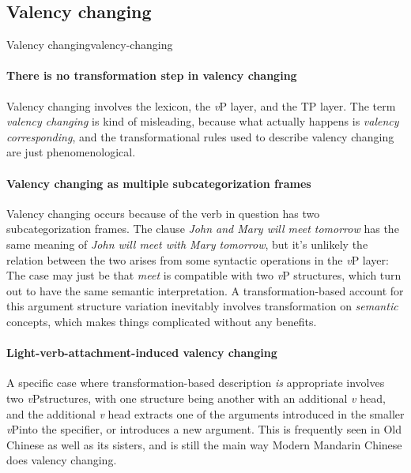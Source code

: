 \documentclass[UTF8, a4paper, oneside, scheme=plain]{ctexrep}
\newcommand*{\term}[1]{\emph{#1}}
\newcommand{\corpus}[1]{\emph{#1}}
\newcommand{\vP}{\textit{v}P}
\begin{document}
\subsection{Valency changing}\label{sec:overview.valency-changing}

\begin{theorybox}{Valency changing}{valency-changing}
    \paragraph*{There is no transformation step in valency changing} 
    Valency changing involves the lexicon, the \vP{} layer, and the TP layer.
    The term \term{valency changing} is kind of misleading,
    because what actually happens is \emph{valency corresponding},
    and the transformational rules used to describe valency changing 
    are just phenomenological.

    \paragraph*{Valency changing as multiple subcategorization frames} 
    Valency changing occurs because of 
    the verb in question has two subcategorization frames.
    The clause \corpus{John and Mary will meet tomorrow} 
    has the same meaning of \corpus{John will meet with Mary tomorrow},
    but it's unlikely the relation between the two arises from some syntactic operations in the \vP{} layer:
    The case may just be that \corpus{meet} is compatible with two \vP{} structures,
    which turn out to have the same semantic interpretation.
    A transformation-based account for this argument structure variation 
    inevitably involves transformation on \emph{semantic} concepts,
    which makes things complicated without any benefits.

    \paragraph*{Light-verb-attachment-induced valency changing} 
    A specific case where transformation-based description \emph{is} appropriate 
    involves two \vP structures, 
    with one structure being 
    another with an additional \term{v} head,
    and the additional \term{v} head 
    extracts one of the arguments introduced in the smaller \vP into the specifier,
    or introduces a new argument.
    This is frequently seen in Old Chinese as well as its sisters,
    and is still the main way Modern Mandarin Chinese does valency changing.


\end{theorybox}
\end{document}
